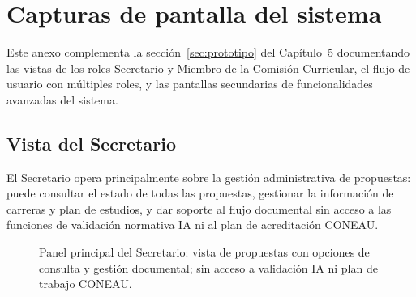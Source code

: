 

\chapter{Capturas de pantalla del sistema}
\label{anexo:capturas}

Este anexo complementa la sección~\ref{sec:prototipo} del Capítulo~5
documentando las vistas de los roles Secretario y Miembro de la Comisión
Curricular, el flujo de usuario con múltiples roles, y las pantallas
secundarias de funcionalidades avanzadas del sistema.

\section{Vista del Secretario}
\label{anexo:vista_secretario}

El Secretario opera principalmente sobre la gestión administrativa de
propuestas: puede consultar el estado de todas las propuestas, gestionar
la información de carreras y plan de estudios, y dar soporte al flujo
documental sin acceso a las funciones de validación normativa IA ni al
plan de acreditación CONEAU.

\begin{figure}[H]
  \centering
  \caption[Dashboard del rol Secretario.]{Panel principal del Secretario:
    vista de propuestas con opciones de consulta y gestión documental;
    sin acceso a validación IA ni plan de trabajo CONEAU.}
  \label{fig:cap_sec_dashboard}
\end{figure}

